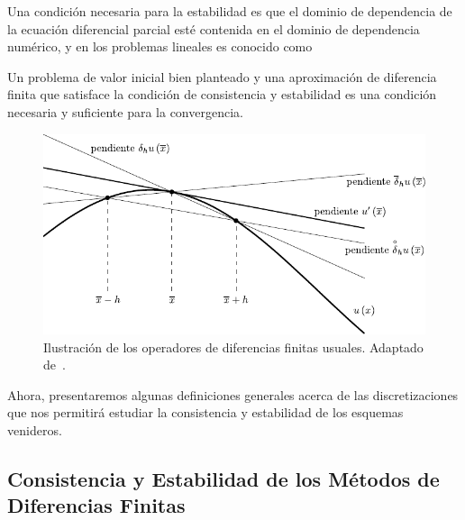 Una condición necesaria para la estabilidad es que el dominio de
dependencia de la ecuación diferencial parcial esté contenida en el
dominio de dependencia numérico, y en los problemas lineales es
conocido como

\begin{theorem}
	Un problema de valor inicial bien planteado y una aproximación de
	diferencia finita que satisface la condición de consistencia y
	estabilidad es una condición necesaria y suficiente para la
	convergencia.
\end{theorem}

\begin{figure}[ht!]
	\centering
	\includegraphics[width=.5\paperwidth]{E_IMAGENES/1_Capitulo2/finite_difference.pdf}
	\caption{
		Ilustración de los operadores de diferencias finitas usuales.
		Adaptado de~\citep{LeVeque2007}.
	}
\end{figure}

Ahora, presentaremos algunas definiciones generales acerca de las
discretizaciones que nos permitirá estudiar la consistencia y
estabilidad de los esquemas venideros.

\subsection{Consistencia y Estabilidad de los Métodos de Diferencias Finitas}

